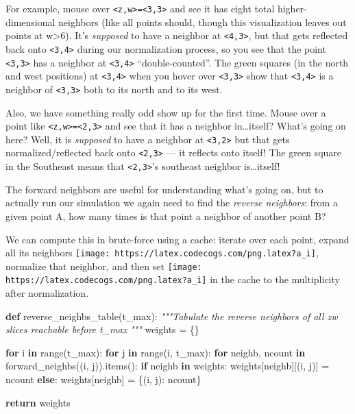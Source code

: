 \documentclass[]{article}
\newenvironment{Shaded}{}{}
\newcommand{\BuiltInTok}[1]{#1}
\newcommand{\CommentTok}[1]{\textcolor[rgb]{0.38,0.63,0.69}{\textit{#1}}}
\newcommand{\ControlFlowTok}[1]{\textcolor[rgb]{0.00,0.44,0.13}{\textbf{#1}}}
\newcommand{\KeywordTok}[1]{\textcolor[rgb]{0.00,0.44,0.13}{\textbf{#1}}}
\newcommand{\NormalTok}[1]{#1}
\newcommand{\OperatorTok}[1]{\textcolor[rgb]{0.40,0.40,0.40}{#1}}
\begin{document}
For example, mouse over
\texttt{\textless{}z,w\textgreater{}=\textless{}3,3\textgreater{}} and see it
has eight total higher-dimensional neighbors (like all points should, though
this visualization leaves out points at w\textgreater6). It's \emph{supposed} to
have a neighbor at \texttt{\textless{}4,3\textgreater{}}, but that gets
reflected back onto \texttt{\textless{}3,4\textgreater{}} during our
normalization process, so you see that the point
\texttt{\textless{}3,3\textgreater{}} has a neighbor at
\texttt{\textless{}3,4\textgreater{}} ``double-counted''. The green squares (in
the north and west positions) at \texttt{\textless{}3,4\textgreater{}} when you
hover over \texttt{\textless{}3,3\textgreater{}} show that
\texttt{\textless{}3,4\textgreater{}} is a neighbor of
\texttt{\textless{}3,3\textgreater{}} both to its north and to its west.

Also, we have something really odd show up for the first time. Mouse over a
point like \texttt{\textless{}z,w\textgreater{}=\textless{}2,3\textgreater{}}
and see that it has a neighbor in\ldots itself? What's going on here? Well, it
is \emph{supposed} to have a neighbor at \texttt{\textless{}3,2\textgreater{}}
but that gets normalized/reflected back onto
\texttt{\textless{}2,3\textgreater{}} --- it reflects onto itself! The green
square in the Southeast means that \texttt{\textless{}2,3\textgreater{}}'s
southeast neighbor is\ldots itself!

The forward neighbors are useful for understanding what's going on, but to
actually run our simulation we again need to find the \emph{reverse neighbors}:
from a given point A, how many times is that point a neighbor of another point
B?

We can compute this in brute-force using a cache: iterate over each point,
expand all its neighbors
\texttt{[image: https://latex.codecogs.com/png.latex?a\_i]}, normalize that
neighbor, and then set
\texttt{[image: https://latex.codecogs.com/png.latex?a\_i]} in the cache to the
multiplicity after normalization.

\begin{Shaded}
\begin{Highlighting}[]
\KeywordTok{def}\NormalTok{ reverse\_neighbs\_table(t\_max):}
    \CommentTok{"""Tabulate the reverse neighbors of all zw slices reachable before t\_max}
\CommentTok{    """}
\NormalTok{    weights }\OperatorTok{=}\NormalTok{ \{\}}

    \ControlFlowTok{for}\NormalTok{ i }\KeywordTok{in} \BuiltInTok{range}\NormalTok{(t\_max):}
        \ControlFlowTok{for}\NormalTok{ j }\KeywordTok{in} \BuiltInTok{range}\NormalTok{(i, t\_max):}
            \ControlFlowTok{for}\NormalTok{ neighb, ncount }\KeywordTok{in}\NormalTok{ forward\_neighbs((i, j)).items():}
                \ControlFlowTok{if}\NormalTok{ neighb }\KeywordTok{in}\NormalTok{ weights:}
\NormalTok{                    weights[neighb][(i, j)] }\OperatorTok{=}\NormalTok{ ncount}
                \ControlFlowTok{else}\NormalTok{:}
\NormalTok{                    weights[neighb] }\OperatorTok{=}\NormalTok{ \{(i, j): ncount\}}

    \ControlFlowTok{return}\NormalTok{ weights}
\end{Highlighting}
\end{Shaded}
\end{document}
